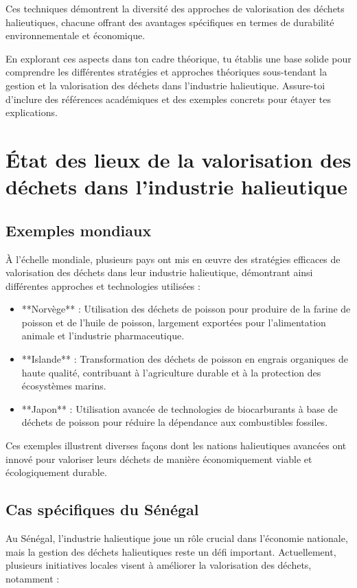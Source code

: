\documentclass[12pt,a4paper]{report}
\begin{document}
Ces techniques démontrent la diversité des approches de valorisation des déchets halieutiques, chacune offrant des avantages spécifiques en termes de durabilité environnementale et économique.

En explorant ces aspects dans ton cadre théorique, tu établis une base solide pour comprendre les différentes stratégies et approches théoriques sous-tendant la gestion et la valorisation des déchets dans l'industrie halieutique. Assure-toi d'inclure des références académiques et des exemples concrets pour étayer tes explications.


\section{État des lieux de la valorisation des déchets dans l'industrie halieutique}

\subsection{Exemples mondiaux}
À l'échelle mondiale, plusieurs pays ont mis en œuvre des stratégies efficaces de valorisation des déchets dans leur industrie halieutique, démontrant ainsi différentes approches et technologies utilisées :

\begin{itemize}
    \item **Norvège** : Utilisation des déchets de poisson pour produire de la farine de poisson et de l'huile de poisson, largement exportées pour l'alimentation animale et l'industrie pharmaceutique.
    \item **Islande** : Transformation des déchets de poisson en engrais organiques de haute qualité, contribuant à l'agriculture durable et à la protection des écosystèmes marins.
    \item **Japon** : Utilisation avancée de technologies de biocarburants à base de déchets de poisson pour réduire la dépendance aux combustibles fossiles.
\end{itemize}

Ces exemples illustrent diverses façons dont les nations halieutiques avancées ont innové pour valoriser leurs déchets de manière économiquement viable et écologiquement durable.

\subsection{Cas spécifiques du Sénégal}
Au Sénégal, l'industrie halieutique joue un rôle crucial dans l'économie nationale, mais la gestion des déchets halieutiques reste un défi important. Actuellement, plusieurs initiatives locales visent à améliorer la valorisation des déchets, notamment :
\end{document}
